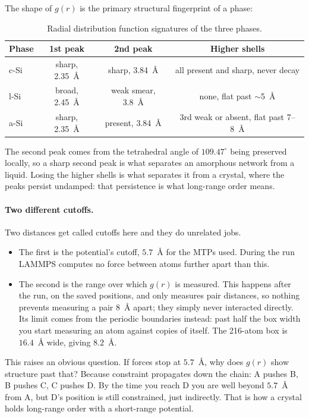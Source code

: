 \documentclass{article}
\begin{document}
The shape of $g(r)$ is the primary structural fingerprint of a phase:
\begin{table}[h]
\centering
\begin{tabular}{lccc}
\hline
Phase & 1st peak & 2nd peak & Higher shells \\
\hline
c-Si & sharp, 2.35~\AA & sharp, 3.84~\AA & all present and sharp, never decay \\
l-Si & broad, 2.45~\AA & weak smear, 3.8~\AA & none, flat past $\sim$5~\AA \\
a-Si & sharp, 2.35~\AA & present, 3.84~\AA & 3rd weak or absent, flat past 7--8~\AA \\
\hline
\end{tabular}
\caption{Radial distribution function signatures of the three phases.}
\label{tab:gr_phases}
\end{table}

The second peak comes from the tetrahedral angle of $109.47^\circ$ being preserved locally, so a sharp second peak is what separates an amorphous network from a liquid. Losing the higher shells is what separates it from a crystal, where the peaks persist undamped: that persistence is what long-range order means.

\paragraph{Two different cutoffs.}
Two distances get called cutoffs here and they do unrelated jobs.
\begin{itemize}
    \item The first is the potential's cutoff, $5.7$~\AA{} for the MTPs used. During the run LAMMPS computes no force between atoms further apart than this.
    \item The second is the range over which $g(r)$ is measured. This happens after the run, on the saved positions, and only measures pair distances, so nothing prevents measuring a pair $8$~\AA{} apart; they simply never interacted directly. Its limit comes from the periodic boundaries instead: past half the box width you start measuring an atom against copies of itself. The 216-atom box is $16.4$~\AA{} wide, giving $8.2$~\AA.
\end{itemize}
 
This raises an obvious question. If forces stop at $5.7$~\AA, why does $g(r)$ show structure past that? Because constraint propagates down the chain: A pushes B, B pushes C, C pushes D. By the time you reach D you are well beyond $5.7$~\AA{} from A, but D's position is still constrained, just indirectly. That is how a crystal holds long-range order with a short-range potential.
\end{document}
